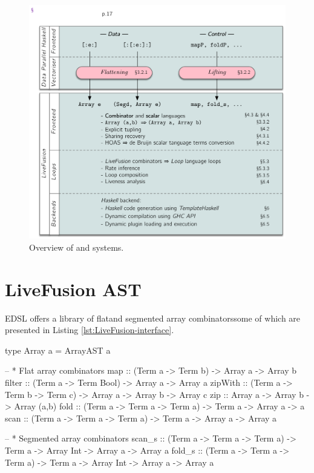 \documentclass[preamble.tex]{subfiles}
\begin{document}
\begin{figure}
  \includegraphics[width=\textwidth]{img/Overview.pdf}
  \caption{Overview of \DPH and \LiveFusion systems.}
  \label{fig:Overview}
\end{figure}



\clearpage

\section{LiveFusion AST}

\LiveFusion EDSL offers a library of flat\iflatcomb and segmented array combinators\isegcomb some of which are presented in Listing \ref{lst:LiveFusion-interface}.

\begin{hscode2}[%
    caption={\LiveFusion interface functions. Typeclass constraints on array elements have been omitted for brevity.},%
    label=lst:LiveFusion-interface,%
]
type Array a = ArrayAST a

-- * Flat array combinators
map      :: (Term a -> Term b) -> Array a -> Array b
filter   :: (Term a -> Term Bool) -> Array a -> Array a
zipWith  :: (Term a -> Term b -> Term c) -> Array a -> Array b -> Array c
zip      :: Array a -> Array b -> Array (a,b)
fold     :: (Term a -> Term a -> Term a) -> Term a -> Array a -> a
scan     :: (Term a -> Term a -> Term a) -> Term a -> Array a -> Array a

-- * Segmented array combinators
scan_s   :: (Term a -> Term a -> Term a) -> Term a
         -> Array Int -> Array a -> Array a
fold_s   :: (Term a -> Term a -> Term a) -> Term a
         -> Array Int -> Array a -> Array a
\end{hscode2}
\end{document}
